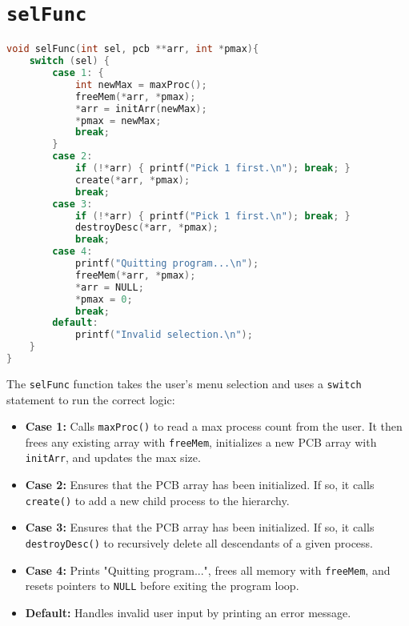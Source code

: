 \documentclass[12pt]{article}
\begin{document}
\section*{\texttt{selFunc}}
\begin{lstlisting}[language=C]
void selFunc(int sel, pcb **arr, int *pmax){
    switch (sel) {
        case 1: {
            int newMax = maxProc();
            freeMem(*arr, *pmax);
            *arr = initArr(newMax);
            *pmax = newMax;
            break;
        }
        case 2:
            if (!*arr) { printf("Pick 1 first.\n"); break; }
            create(*arr, *pmax);
            break;
        case 3:
            if (!*arr) { printf("Pick 1 first.\n"); break; }
            destroyDesc(*arr, *pmax);
            break;
        case 4:
            printf("Quitting program...\n");
            freeMem(*arr, *pmax);
            *arr = NULL;
            *pmax = 0;
            break;
        default:
            printf("Invalid selection.\n");
    }
}
\end{lstlisting}
The \texttt{selFunc} function takes the user’s menu selection and uses a \texttt{switch} 
statement to run the correct logic:

\begin{itemize}
  \item \textbf{Case 1:} Calls \texttt{maxProc()} to read a max process count from the user. 
  It then frees any existing array with \texttt{freeMem}, initializes a new PCB array 
  with \texttt{initArr}, and updates the max size.

  \item \textbf{Case 2:} Ensures that the PCB array has been initialized. If so, it 
  calls \texttt{create()} to add a new child process to the hierarchy.

  \item \textbf{Case 3:} Ensures that the PCB array has been initialized. If so, it 
  calls \texttt{destroyDesc()} to recursively delete all descendants of a given process.

  \item \textbf{Case 4:} Prints "Quitting program...", frees all memory with \texttt{freeMem}, 
  and resets pointers to \texttt{NULL} before exiting the program loop.

  \item \textbf{Default:} Handles invalid user input by printing an error message.
\end{itemize}



\newpage
\end{document}
